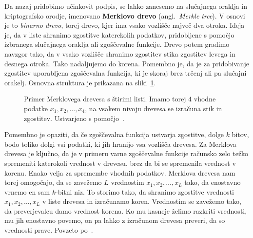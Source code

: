 \documentclass[isrm2, tisk]{fmfdelo}
\begin{document}
Da nazaj pridobimo učinkovit podpis, se lahko zanesemo na slučajnega oraklja in kriptografsko 
orodje, imenovano \textbf{Merklovo drevo} (angl.\ \textit{Merkle tree}). V osnovi je to 
\textit{binarno drevo}, torej drevo, kjer ima vsako vozlišče največ dva otroka. Ideja je, da v liste 
shranimo zgostitve katerekolih podatkov, pridobljene s pomočjo izbranega slučajnega oraklja ali zgoščevalne 
funkcije. Drevo potem gradimo navzgor tako, da v vsako vozlišče shranimo zgostitev stika zgostitev levega in desnega 
otroka. Tako nadaljujemo do korena. Pomembno je, da je za pridobivanje zgostitev uporabljena zgoščevalna 
funkcija, ki je skoraj brez trčenj ali pa slučajni orakelj. Osnovna 
struktura je prikazana na sliki~\ref{fig:merkle}.
\begin{figure}[ht]
  \centering
  \caption[Merklovo drevo.]{Primer Merklovega drevesa s štirimi listi. Imamo torej $4$ vhodne podatke
    $x_1, x_2, \dots, x_4$, na vsakem nivoju drevesa se izračuna stik in zgostitev. Ustvarjeno s 
    pomočjo~\cite{SOtikz}.}
  \label{fig:merkle}
\end{figure}

Pomembno je opaziti, da če zgoščevalna funkcija ustvarja zgostitve, dolge $k$ bitov, bodo toliko 
dolgi vsi podatki, ki jih hranijo vsa vozlišča drevesa. Za Merklova drevesa je ključno, da je v primeru 
varne zgoščevalne funkcije računsko zelo težko spremeniti katerokoli vrednost v drevesu, brez da bi se 
spremenila vrednost v korenu. Enako velja za spremembe vhodnih podatkov. Merklova drevesa nam torej 
omogočajo, da se zavežemo $L$ vrednostim $x_1, x_2, \dots, x_L$ tako, da enostavno vrnemo en sam 
$k$-bitni niz. To storimo tako, da shranimo zgostitve vrednosti $x_1, x_2, \dots, x_L$ v liste drevesa 
in izračunamo koren. Vrednostim se zavežemo tako, da preverjevalcu damo vrednost korena. Ko mu kasneje 
želimo razkriti vrednosti, mu jih enostavno povemo, on pa lahko z izračunom drevesa preveri, da so 
vrednosti prave. Povzeto po~\cite{micali2000csproofs}.
\end{document}

